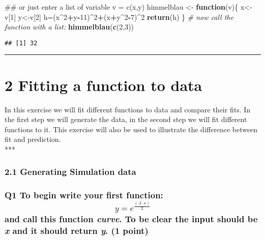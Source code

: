 \documentclass[]{article}
\newenvironment{Shaded}{\begin{snugshade}}{\end{snugshade}}
\newcommand{\KeywordTok}[1]{\textcolor[rgb]{0.13,0.29,0.53}{\textbf{#1}}}
\newcommand{\DecValTok}[1]{\textcolor[rgb]{0.00,0.00,0.81}{#1}}
\newcommand{\StringTok}[1]{\textcolor[rgb]{0.31,0.60,0.02}{#1}}
\newcommand{\CommentTok}[1]{\textcolor[rgb]{0.56,0.35,0.01}{\textit{#1}}}
\newcommand{\ControlFlowTok}[1]{\textcolor[rgb]{0.13,0.29,0.53}{\textbf{#1}}}
\newcommand{\OperatorTok}[1]{\textcolor[rgb]{0.81,0.36,0.00}{\textbf{#1}}}
\newcommand{\NormalTok}[1]{#1}
\begin{document}
\begin{Shaded}
\begin{Highlighting}[]
\NormalTok{## or just enter a list of variable v = c(x,y)}
\NormalTok{himmelblau <-}\StringTok{ }\ControlFlowTok{function}\NormalTok{(v)\{}
\NormalTok{  x<-v[}\DecValTok{1}\NormalTok{]}
\NormalTok{  y<-v[}\DecValTok{2}\NormalTok{]}
\NormalTok{  h=(x}\OperatorTok{^}\DecValTok{2}\OperatorTok{+}\NormalTok{y}\OperatorTok{-}\DecValTok{11}\NormalTok{)}\OperatorTok{^}\DecValTok{2}\OperatorTok{+}\NormalTok{(x}\OperatorTok{+}\NormalTok{y}\OperatorTok{^}\DecValTok{2}\OperatorTok{-}\DecValTok{7}\NormalTok{)}\OperatorTok{^}\DecValTok{2}
  \KeywordTok{return}\NormalTok{(h)}
\NormalTok{\}}
\CommentTok{# now call the function with a list:}
\KeywordTok{himmelblau}\NormalTok{(}\KeywordTok{c}\NormalTok{(}\DecValTok{2}\NormalTok{,}\DecValTok{3}\NormalTok{))}
\end{Highlighting}
\end{Shaded}

\begin{verbatim}
## [1] 32
\end{verbatim}

\begin{center}\rule{0.5\linewidth}{\linethickness}\end{center}

\section{2 Fitting a function to data}\label{fitting-a-function-to-data}

In this exercise we will fit different functions to data and compare
their fits. In the first step we will generate the data, in the second
step we will fit different functions to it. This exercise will also be
used to illustrate the difference between fit and prediction.\\
***

\subsubsection{2.1 Generating Simulation
data}\label{generating-simulation-data}

\subsubsection{\texorpdfstring{Q1 To begin write your first function:
\[y = e^{\frac{(.3 \cdot x)}{2}}\] and call this function \emph{curve}.
To be clear the input should be \emph{x} and it should return \emph{y}.
(1
point)}{Q1 To begin write your first function: y = e\^{}\{\textbackslash{}frac\{(.3 \textbackslash{}cdot x)\}\{2\}\} and call this function curve. To be clear the input should be x and it should return y. (1 point)}}\label{q1-to-begin-write-your-first-function-y-efrac.3-cdot-x2-and-call-this-function-curve.-to-be-clear-the-input-should-be-x-and-it-should-return-y.-1-point}
\end{document}
